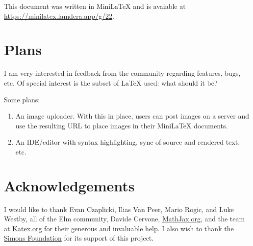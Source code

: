This document was written in MiniLaTeX and is avaiable at \href{https://minilatex.lamdera.app/g/22}{https://minilatex.lamdera.app/g/22}.


\section{Plans}

I am very interested in feedback from the community regarding features, bugs, etc.  Of special interest is the subset of LaTeX used: what should it be? 

Some plans:

\begin{enumerate}

\item An image uploader.  With this in place, users can post images on a server and use the resulting URL to place images in their MiniLaTeX documents. 

\item An IDE/editor with syntax highlighting, sync of source and rendered text,  etc.



\end{enumerate}


\section{Acknowledgements}

I would like to thank Evan Czaplicki, Ilias Van Peer, Mario Rogic, and Luke Westby, all of the Elm community, Davide Cervone, \href{https://mathjax.org}{MathJax.org}, and the team at \href{https://katex.org}{Katex.org} for their generous and invaluable help.   I also wish to thank the \href{https://simonsfoundation.org}{Simons Foundation} for its support of this project.


